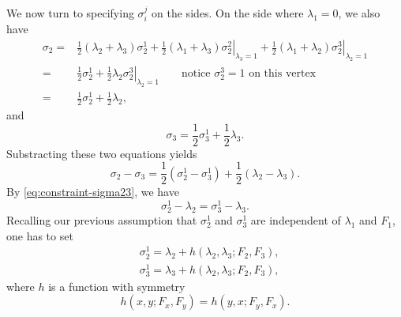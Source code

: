 We now turn to specifying $\sigma^j_i$ on the sides. 
On the side where $\lambda_1 = 0$, we also have
\[
  \begin{split}
    \sigma_2 = & \frac12(\lambda_2 + \lambda_3) \sigma^1_2 
    + \frac12(\lambda_1 + \lambda_3) 
    \left.\sigma^2_2\right|_{\lambda_3 = 1}
    + \frac12(\lambda_1 + \lambda_2) \left.\sigma^3_2\right|_{\lambda_2 = 1} \\
    = & \frac12 \sigma^1_2 + \frac12 \lambda_2 \left.\sigma^3_2\right|_{\lambda_2 = 1} 
    \qquad
  \text{notice } \sigma^3_2 = 1 \text{ on this vertex}\\
  = & \frac12 \sigma^1_2 + \frac12 \lambda_2,
\end{split}
\]
and
\[
  \sigma_3 = \frac12 \sigma^1_3 + \frac12 \lambda_3.
\]
Substracting these two equations yields
\[
  \sigma_2 - \sigma_3 = \frac12 (\sigma^1_2 - \sigma^1_3) + 
  \frac12 (\lambda_2 - \lambda_3).
\]
By \eqref{eq:constraint-sigma23}, we have
\[
\sigma^1_2 - \lambda_2 = \sigma^1_3 - \lambda_3.
\]
Recalling our previous assumption that $\sigma^1_2$ and $\sigma^1_3$ 
are independent of $\lambda_1$ and $F_1$, one has to set
\begin{equation}\label{eq:sigma-on-bound}
  \begin{split}
    & \sigma_2^1 = \lambda_2
    + h\left(\lambda_2, \lambda_3;
    F_2, F_3 \right),\\
    & \sigma_3^1 = \lambda_3
    + h\left(\lambda_2, \lambda_3;
    F_2, F_3\right),
  \end{split}
\end{equation}
where $h$ is a function with symmetry
\[
h(x,y;F_x,F_y) = h(y,x;F_y,F_x).
\]

